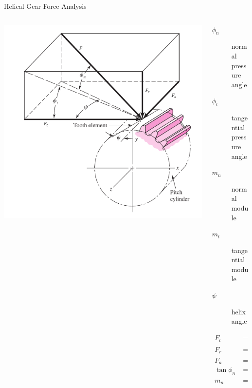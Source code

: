 \documentclass[10pt, svgnames]{beamer}
\begin{document}
\begin{frame}[label={sec:orgaec3f0c}]{Helical Gear Force Analysis}
\begin{columns}
\begin{column}{0.6\columnwidth}
\begin{center}
\includegraphics[width=.9\linewidth]{pictures/helical-gear-forces.png}
\end{center}
\end{column}

\begin{column}{0.5\columnwidth}
\begin{description}
\item[{\(\phi_{n}\)}] normal pressure angle

\item[{\(\phi_{t}\)}] tangential pressure angle

\item[{\(m_{n}\)}] normal module

\item[{\(m_{t}\)}] tangential module

\item[{\(\psi\)}] helix angle
\end{description}

\begin{align*}
    F_{t} &= \frac{\text{Power}}{v_{t}} \\
    F_{r} &= F_{t} \tan \phi_{t} \\
    F_{a} &= F_{t} \tan \psi \\
    \tan \phi_{n} &= \tan \phi_{t} \cos \psi \\
    m_{n} &= m_{t} \cos \psi
\end{align*}
\end{column}
\end{columns}
\end{frame}
\end{document}
